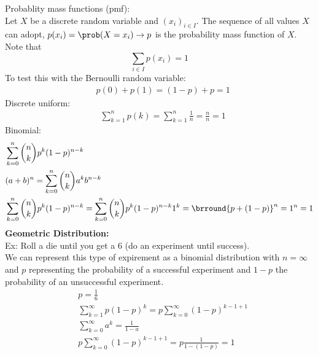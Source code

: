 Probablity mass functions (pmf):\\
Let $X$ be a discrete random variable and $(x_i)_{i\in I}$. The sequence of all values $X$ can adopt, $p(x_i)=\prob(X=x_i)\to p$ is the probability mass function of $X$. Note that
\[\sum_{i\in I}p(x_i)=1\]
To test this with the Bernoulli random variable:\\
\begin{align*}
    &p(0)+p(1)=(1-p)+p=1
\end{align*}
Discrete uniform:
\begin{align*}
    &\sum_{k=1}^np(k)=\sum_{k=1}^n\frac{1}{n}=\frac{n}{n}=1
\end{align*}
Binomial:
\begin{align*}
    &\sum_{k=0}^n\binom{n}{k}p^k(1-p)^{n-k}\\
    &(a+b)^n=\sum_{k=0}^n\binom{n}{k}a^kb^{n-k}\\
    &\sum_{k=0}^n\binom{n}{k}p^k(1-p)^{n-k}=\sum_{k=0}^n\binom{n}{k}p^k(1-p)^{n-k}1^k=\brround{p+(1-p)}^n=1^n=1
\end{align*}
\textbf{Geometric Distribution:}\\
Ex: Roll a die until you get a 6 (do an experiment until success).\\
We can represent this type of expirement as a binomial distribution with $n=\infty$ and $p$ representing the probability of a successful experiment and $1-p$ the probability of an unsuccessful experiment.
\begin{align*}
    &p=\frac{1}{6}\\
    &\sum_{k=1}^\infty p(1-p)^k=p\sum_{k=0}^\infty(1-p)^{k-1+1}\\
    &\sum_{k=0}^\infty a^k=\frac{1}{1-a}\\
    &p\sum_{k=0}^\infty(1-p)^{k-1+1}=p\frac{1}{1-(1-p)}=1
\end{align*}
